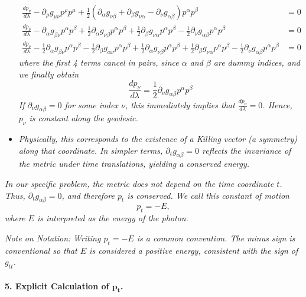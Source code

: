 \begin{itemize}
\begin{align*}
  \frac{dp_\nu}{d\lambda} - \partial_\rho g_{\mu\nu} p^\rho p^\mu + \frac{1}{2} \left( \partial_\alpha g_{\nu\beta} + \partial_\beta g_{\nu\alpha} - \partial_\nu g_{\alpha\beta} \right) p^\alpha p^\beta &= 0 \\
  \frac{dp_\nu}{d\lambda} - \partial_\alpha g_{\beta\nu} p^\alpha p^\beta + \frac{1}{2}\partial_\alpha g_{\nu\beta} p^\alpha p^\beta + \frac{1}{2} \partial_\beta g_{\nu\alpha} p^\alpha p^\beta - \frac{1}{2} \partial_\nu g_{\alpha\beta} p^\alpha p^\beta &= 0 \\
  \frac{dp_\nu}{d\lambda} - \frac{1}{2} \partial_\alpha g_{\beta\nu} p^\alpha p^\beta - \frac{1}{2} \partial_\beta g_{\alpha\nu} p^\alpha p^\beta + \frac{1}{2}\partial_\alpha g_{\nu\beta} p^\alpha p^\beta + \frac{1}{2} \partial_\beta g_{\nu\alpha} p^\alpha p^\beta - \frac{1}{2} \partial_\nu g_{\alpha\beta} p^\alpha p^\beta &= 0
\end{align*}
\textit{where the first 4 terms cancel in pairs, since $\alpha$ and $\beta$ are dummy indices, and we finally obtain}
\[
\frac{dp_\nu}{d\lambda} = \frac{1}{2} \partial_\nu g_{\alpha\beta} p^\alpha p^\beta
\]
\textit{If \(\partial_\nu g_{\alpha\beta} = 0\) for some index \(\nu\), this immediately implies that \(\frac{dp_\nu}{d\lambda} = 0\). Hence, \(p_\nu\) is constant along the geodesic.}

\item \textit{Physically, this corresponds to the existence of a \emph{Killing vector} (a symmetry) along that coordinate. In simpler terms, \(\partial_t g_{\alpha\beta} = 0\) reflects the invariance of the metric under time translations, yielding a conserved energy.}
\end{itemize}

\textit{In our specific problem, the metric does not depend on the time coordinate \(t\). Thus, \(\partial_t g_{\alpha\beta} = 0\), and therefore \(p_t\) is conserved. We call this constant of motion}
\begin{equation}
p_t = - E,
\end{equation}
\textit{where \(E\) is interpreted as the energy of the photon.}

\textit{Note on Notation:} \textit{Writing \(p_t = -E\) is a common convention. The minus sign is conventional so that \(E\) is considered a positive energy, consistent with the sign of \(g_{tt}\).}
\paragraph{5. Explicit Calculation of \(\boldsymbol{p_t}\).}


